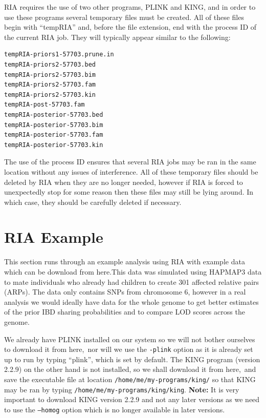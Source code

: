 \documentclass[a4paper,12pt]{article}
\newcommand{\code}[1]{{\footnotesize{{\tt #1}}}}
\begin{document}
RIA requires the use of two other programs, PLINK and KING, and in order to use these programs several temporary files must be created. All of these files begin with ``tempRIA'' and, before the file extension, end with the process ID of the current RIA job. They will typically appear similar to the following: 
\vspace{0.35cm} \begin{lstlisting}
tempRIA-priors1-57703.prune.in
tempRIA-priors2-57703.bed
tempRIA-priors2-57703.bim
tempRIA-priors2-57703.fam
tempRIA-priors2-57703.kin
tempRIA-post-57703.fam
tempRIA-posterior-57703.bed
tempRIA-posterior-57703.bim
tempRIA-posterior-57703.fam
tempRIA-posterior-57703.kin

\end{lstlisting} \vspace{0.35cm}
The use of the process ID ensures that several RIA jobs may be ran in the same location without any issues of interference. All of these temporary files should be deleted by RIA when they are no longer needed, however if RIA is forced to unexpectedly stop for some reason then these files may still be lying around. In which case, they should be carefully deleted if necessary. 




\section{RIA Example}
\label{example}

This section runs through an example analysis using RIA with example data which can be download from here.This data was simulated using HAPMAP3 data to mate individuals who already had children to create 301 affected relative pairs (ARPs). The data only contains SNPs from chromosome 6, however in a real analysis we would ideally have data for the whole genome to get better estimates of the prior IBD sharing probabilities and to compare LOD scores across the genome. 

We already have PLINK installed on our system so we will not bother ourselves to download it from here,~nor will we use the \code{-plink} option as it is already set up to run by typing ``plink'', which is set by default. The KING program (version 2.2.9) on the other hand is not installed, so we shall download it from here,~and save the executable file at location \code{/home/me/my-programs/king/} so that KING may be ran by typing \code{/home/me/my-programs/king/king}. {\bf Note:} It is very important to download KING version 2.2.9 and not any later versions as we need to use the \code{--homog} option which is no longer available in later versions. 
\end{document}
